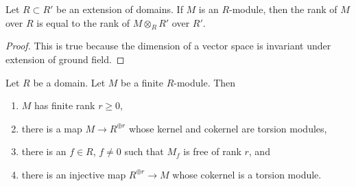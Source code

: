 \begin{lemma}
\label{lemma-dominant-pullback-rank}
Let $R \subset R'$ be an extension of domains. If $M$ is an $R$-module,
then the rank of $M$ over $R$ is equal to the rank of $M \otimes_R R'$
over $R'$.
\end{lemma}

\begin{proof}
This is true because the dimension of a vector space is invariant
under extension of ground field.
\end{proof}

\begin{lemma}
\label{lemma-finite-module-rank}
Let $R$ be a domain. Let $M$ be a finite $R$-module. Then
\begin{enumerate}
\item $M$ has finite rank $r \geq 0$,
\item there is a map $M \to R^{\oplus r}$ whose kernel and cokernel
are torsion modules,
\item there is an $f \in R$, $f \not = 0$ such that $M_f$
is free of rank $r$, and
\item there is an injective map $R^{\oplus r} \to M$
whose cokernel is a torsion module.
\end{enumerate}
\end{lemma}

